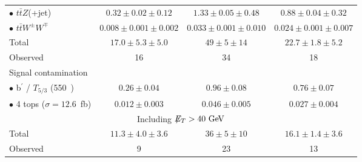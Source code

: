 \begin{table}[p]
\begin{center}
\begin{tabular}{l|c|c|c}
      $\bullet$ $t\bar{t}Z$(+jet) & $0.32\pm 0.02\pm 0.12$ & $1.33\pm 0.05\pm 0.48$ & $0.88\pm 0.04\pm 0.32$ \\
      $\bullet$ $t\bar{t}W^{\pm}W^\mp$ & $0.008\pm 0.001\pm 0.002$ & $0.033\pm 0.001\pm 0.010$ & $0.024\pm 0.001\pm 0.007$ \\
      \hline
      Total & $17.0 \pm 5.3 \pm 5.0$ & $49 \pm 5 \pm 14$ & $22.7 \pm 1.8 \pm 5.2$ \\
      \hline
      Observed & 16 & 34 & 18 \\
      \hline
      Signal contamination & & & \\
      $\bullet$ b$^\prime$ / $T_{5/3}$ (550~\GeV{}) & $0.26\pm0.04$ & $0.96\pm0.08$ & $0.76\pm0.07$ \\
      $\bullet$ 4 tops ($\sigma=12.6$~fb) & $0.012\pm0.003$ & $0.046\pm0.005$ & $0.027\pm0.004$ \\
      \hline
      \multicolumn{4}{c}{Including $\met{}>40 \GeV$} \\
      \hline
      Total & $11.3 \pm 4.0 \pm 3.6$ & $36 \pm 5 \pm 10$ & $16.1 \pm 1.4 \pm 3.6$ \\
      \hline
      Observed & 9 & 23 & 13 \\
      \hline
    \end{tabular}
  \end{center}
\end{table}


